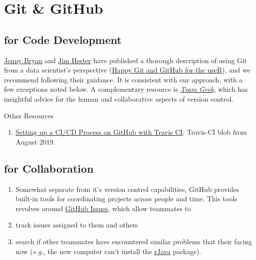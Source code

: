 \documentclass[
]{book}
\providecommand{\tightlist}{%
  \setlength{\itemsep}{0pt}\setlength{\parskip}{0pt}}
\begin{document}
\hypertarget{appendix-appendix}{%
\appendix}


\hypertarget{git}{%
\chapter{Git \& GitHub}\label{git}}

\hypertarget{git-code}{%
\section{for Code Development}\label{git-code}}

\href{https://github.com/jennybc}{Jenny Bryan} and \href{https://github.com/jimhester}{Jim Hester} have published a thorough description of using Git from a data scientist's perspective (\href{https://happygitwithr.com/}{Happy Git and GitHub for the useR}), and we recommend following their guidance. It is consistent with our approach, with a few exceptions noted below. A complementary resource is \emph{\href{https://smile.amazon.com/dp/1449302440}{Team Geek}}, which has insightful advice for the human and collaborative aspects of version control.

Other Resources

\begin{enumerate}
\def\labelenumi{\arabic{enumi}.}
\tightlist
\item
  \href{https://blog.travis-ci.com/2019-05-30-setting-up-a-ci-cd-process-on-github}{Setting up a CI/CD Process on GitHub with Travis CI}. Travis-CI blob from August 2019.
\end{enumerate}

\hypertarget{git-collaboration}{%
\section{for Collaboration}\label{git-collaboration}}

\begin{enumerate}
\def\labelenumi{\arabic{enumi}.}
\item
  Somewhat separate from it's version control capabilities, GitHub provides built-in tools for coordinating projects across people and time. This tools revolves around \href{https://guides.github.com/features/issues/}{GitHub Issues}, which allow teammates to
\item
  track issues assigned to them and others
\item
  search if other teammates have encountered similar problems that their facing now (\emph{e.g.}, the new computer can't install the \href{https://CRAN.R-project.org/package=rJava}{rJava} package).
\end{enumerate}
\end{document}

